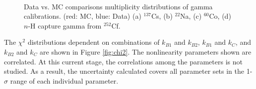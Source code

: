 \begin{figure}[h!]
\centering
{}\quad
{} \\
\caption[Full detector data vs MC gamma multiplicity comparisons]{Data vs. MC comparisons multiplicity distributions of gamma calibrations. (red: MC, blue: Data) (a) $^{137}$Cs, (b) $^{22}$Na, (c) $^{60}$Co, (d) $n$-H capture gamma from $^{252}$Cf.}
\label{fig:multi}
\end{figure}

The $\chi^2$ distributions dependent on combinations of $k_{B1}$ and $k_{B2}$, $k_{B1}$ and $k_{C}$, and $k_{B2}$ and $k_{C}$ are shown in Figure \ref{fig:chi2}.
The nonlinearity parameters shown are correlated.
At this current stage, the correlations among the parameters is not studied.
As a result, the uncertainty calculated covers all parameter sets in the 1-$\sigma$ range of each individual parameter.


